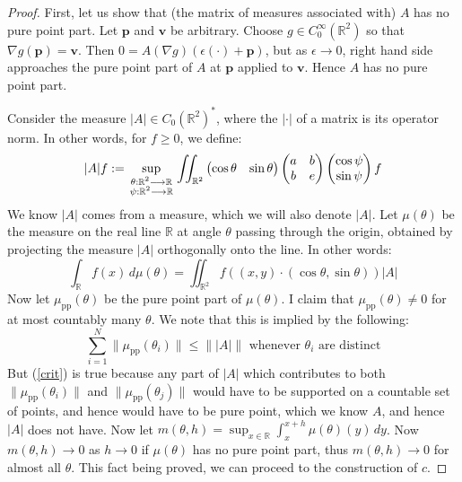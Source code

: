 \documentclass{amsart}
\newcommand{\R}			{\mathbb R}
\newcommand{\p}			{\mathbf p}
\newcommand{\vv}		{\mathbf v}
\newcommand{\map}		{\longrightarrow}
\newcommand{\grad}		{\nabla}
\numberwithin{equation}{section}
\begin{document}
\begin{proof}
First, let us show that (the matrix of measures associated with) 
$A$ has no pure point part.  Let $\p$ 
and $\vv$ be arbitrary.  Choose $g\in C_0^\infty(\R^2)$ so 
that $\grad g(\p)=\vv$.  Then $0=A(\grad g)(\epsilon(\cdot)+\p)$, 
but as $\epsilon\to 0$, right hand side approaches the pure 
point part of $A$ at $\p$ applied to $\vv$.  Hence $A$ has 
no pure point part.

Consider the measure $|A|\in C_0(\R^2)^*$, where the 
$|\cdot|$ of a matrix is its operator norm.  In other words, 
for $f\geq 0$, we define:
\begin{equation}
|A|f:=\sup_{\begin{smallmatrix}\theta:\R^2\map\R\cr\psi:\R^2\map\R\end{smallmatrix}}\iint_{\R^2}
\left(\begin{matrix}\cos\theta&\sin\theta\end{matrix}\right)
\left(\begin{matrix}a&b\cr b&e\end{matrix}\right)
\left(\begin{matrix}\cos\psi\cr \sin\psi\end{matrix}\right)f
\end{equation}
We know $|A|$ comes from a measure, which we will also denote 
$|A|$.  Let $\mu(\theta)$ 
be the measure on the real line $\R$ at angle $\theta$ passing 
through the origin, obtained by projecting the 
measure $|A|$ orthogonally onto the line.  In other words:
\begin{equation}
\int_\R f(x)\,d\mu(\theta)=\iint_{\R^2}f((x,y)\cdot(\cos\theta,\sin\theta))|A|
\end{equation}
Now let $\mu_{\text{pp}}(\theta)$ be the pure point part of 
$\mu(\theta)$.  I claim that $\mu_{\text{pp}}(\theta)\ne 0$ for 
at most countably many $\theta$.  We note that this is implied 
by the following:
\begin{equation}\label{crit}
\sum_{i=1}^N\|\mu_{\text{pp}}(\theta_i)\|\leq\||A|\|\text{ whenever $\theta_i$ are distinct}
\end{equation}
But (\ref{crit}) is true because any part of $|A|$ which 
contributes to both $\|\mu_{\text{pp}}(\theta_i)\|$ and 
$\|\mu_{\text{pp}}(\theta_j)\|$ would have to be supported on 
a countable set of points, and hence would have to be pure point, 
which we know $A$, and hence $|A|$ does not have.  Now let 
$m(\theta,h)=\sup_{x\in\R}\int_x^{x+h}\mu(\theta)(y)\,dy$.  
Now $m(\theta,h)\to 0$ as $h\to 0$ if $\mu(\theta)$ has no 
pure point part, thus $m(\theta,h)\to 0$ for almost all $\theta$.  
This fact being proved, we can proceed to the construction of $c$.


\end{proof}
\end{document}
